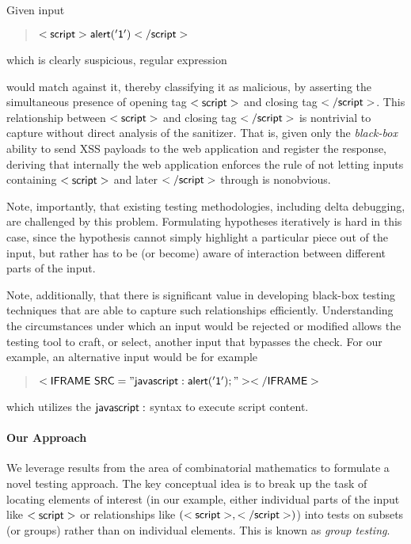 Given input 
\begin{quote}
$\sf{<script>alert('1')</script>}$
\end{quote}
which is clearly suspicious, regular expression
\begin{quote}
\end{quote}
would match against it, thereby classifying it as malicious, by asserting the simultaneous presence of opening tag ${\sf <script>}$ and closing tag ${\sf </script>}$. This relationship between ${\sf <script>}$ and closing tag ${\sf </script>}$ is nontrivial to capture without direct analysis of the sanitizer. That is, given only the \emph{black-box} ability to send XSS payloads to the web application and register the response, deriving that internally the web application enforces the rule of not letting inputs containing ${\sf <script>}$ and later ${\sf </script>}$ through is nonobvious.

Note, importantly, that existing testing methodologies, including delta debugging, are challenged by this problem. Formulating hypotheses iteratively is hard in this case, since the hypothesis cannot simply highlight a particular piece out of the input, but rather has to be (or become) aware of interaction between different parts of the input.

Note, additionally, that there is significant value in developing black-box testing techniques that are able to capture such relationships efficiently. Understanding the circumstances under which an input would be rejected or modified allows the testing tool to craft, or select, another input that bypasses the check. For our example, an alternative input would be for example
\begin{quote}
	${\sf <IFRAME~SRC="javascript:alert('1');"></IFRAME>}$
\end{quote}
which utilizes the ${\sf javascript:}$ syntax to execute script content.

\paragraph{Our Approach} We leverage results from the area of combinatorial mathematics to formulate a novel testing approach. The key conceptual idea is to break up the task of locating elements of interest (in our example, either individual parts of the input like ${\sf <script>}$ or relationships like ${\sf (<script>, </script>)}$) into tests on subsets (or groups) rather than on individual elements. This is known as \emph{group testing}.


